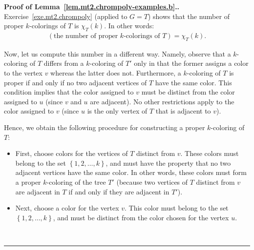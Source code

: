 \documentclass[numbers=enddot,12pt,final,onecolumn,notitlepage]{scrartcl}%
\theoremstyle{definition}
\newenvironment{proof}[1][Proof]{\noindent\textbf{#1.} }{\ \rule{0.5em}{0.5em}}
\newcommand{\set}[1]{\left\{ #1 \right\}}
\newcommand{\tup}[1]{\left( #1 \right)}
\begin{document}
\begin{proof}[Proof of Lemma~\ref{lem.mt2.chrompoly-examples.b}.]
Exercise~\ref{exe.mt2.chrompoly} (applied to $G = T$)
shows that the number of proper $k$-colorings of $T$ is
$\chi_{T} \tup{k}$.
In other words:
\begin{align}
\tup{\text{the number of proper } k \text{-colorings of } T}
= \chi_T \tup{k} .
\label{pf.lem.mt2.chrompoly-examples.b.1}
\end{align}

Now, let us compute this number in a different way.
Namely, observe that a $k$-coloring of $T$ differs from
a $k$-coloring of $T'$ only in that the former assigns
a color to the vertex $v$ whereas the latter does not.
Furthermore, a $k$-coloring of $T$ is proper if and only if
no two adjacent vertices of $T$ have the same color.
This condition implies that the color assigned to $v$ must
be distinct from the color assigned to $u$ (since $v$ and
$u$ are adjacent).
No other restrictions apply to the color assigned to $v$
(since $u$ is the only vertex of $T$ that is adjacent to $v$).

Hence, we obtain the following procedure for constructing
a proper $k$-coloring of $T$:

\begin{itemize}
\item First, choose colors for the vertices of $T$
      distinct from $v$.
      These colors must belong to the set
      $\set{1, 2, \ldots, k}$, and must have the property
      that no two adjacent vertices have the same color.
      In other words, these colors must form a proper
      $k$-coloring of the tree $T'$
      (because two vertices of $T$ distinct from $v$
      are adjacent in $T$ if and only if they are adjacent
      in $T'$).
\item Next, choose a color for the vertex $v$.
      This color must belong to the set
      $\set{1, 2, \ldots, k}$, and must be distinct
      from the color chosen for the vertex $u$.
\end{itemize}


\end{proof}
\end{document}
